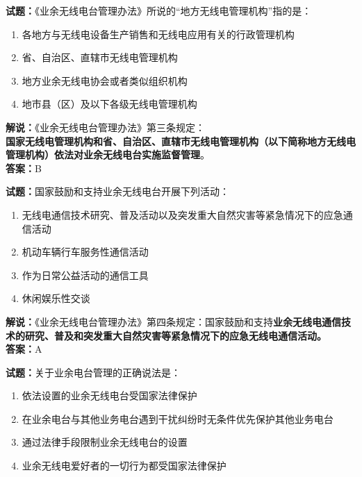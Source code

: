 \documentclass{ctexbook}
\begin{document}
\bigskip


\noindent\textbf{试题：}《业余无线电台管理办法》所说的“地方无线电管理机构”指的是：

\begin{enumerate}[leftmargin=3em]
	\item 各地方与无线电设备生产销售和无线电应用有关的行政管理机构
	\item 省、自治区、直辖市无线电管理机构
	\item 地方业余无线电协会或者类似组织机构
	\item 地市县（区）及以下各级无线电管理机构
\end{enumerate}

\noindent\textbf{解说：}《业余无线电台管理办法》第三条规定：\\\textbf{国家无线电管理机构和省、自治区、直辖市无线电管理机构（以下简称地方无线电管理机构）依法对业余无线电台实施监督管理}。\\\noindent\textbf{答案：}B

\bigskip


\noindent\textbf{试题：}国家鼓励和支持业余无线电台开展下列活动：

\begin{enumerate}[leftmargin=3em]
	\item 无线电通信技术研究、普及活动以及突发重大自然灾害等紧急情况下的应急通信活动
	\item 机动车辆行车服务性通信活动
	\item 作为日常公益活动的通信工具
	\item 休闲娱乐性交谈
\end{enumerate}

\noindent\textbf{解说：}《业余无线电台管理办法》第四条规定：国家鼓励和支持\textbf{业余无线电通信技术的研究、普及和突发重大自然灾害等紧急情况下的应急无线电通信活动。}\\\noindent\textbf{答案：}A

\bigskip


\noindent\textbf{试题：}关于业余电台管理的正确说法是：

\begin{enumerate}[leftmargin=3em]
	\item 依法设置的业余无线电台受国家法律保护
	\item 在业余电台与其他业务电台遇到干扰纠纷时无条件优先保护其他业务电台
	\item 通过法律手段限制业余无线电台的设置
	\item 业余无线电爱好者的一切行为都受国家法律保护
\end{enumerate}
\end{document}

